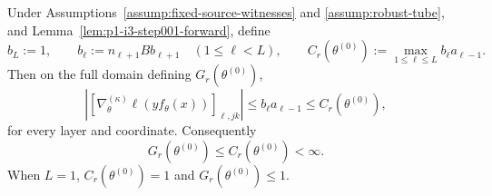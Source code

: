 \begin{proposition}
\label{prop:p1-i3-step001-gradient}
Under Assumptions~\ref{assump:fixed-source-witnesses} and
\ref{assump:robust-tube}, and Lemma~\ref{lem:p1-i3-step001-forward}, define
\[
b_L:=1,
\qquad b_\ell:=n_{\ell+1}B b_{\ell+1}\quad(1\leq\ell<L),
\qquad
C_r(\theta^{(0)}):=\max_{1\leq\ell\leq L}b_\ell a_{\ell-1}.
\tag{26}\label{eq:p1-i3-eq026}
\]
Then on the full domain defining $G_r(\theta^{(0)})$,
\[
\left|
[\nabla_\theta^{(\kappa)}\ell(yf_\theta(x))]_{\ell,jk}
\right|
\leq b_\ell a_{\ell-1}\leq C_r(\theta^{(0)}),
\tag{27}\label{eq:p1-i3-eq027}
\]
for every layer and coordinate.  Consequently
\[
G_r(\theta^{(0)})\leq C_r(\theta^{(0)})<\infty.
\tag{28}\label{eq:p1-i3-eq028}
\]
When $L=1$, $C_r(\theta^{(0)})=1$ and $G_r(\theta^{(0)})\leq1$.
\end{proposition}

